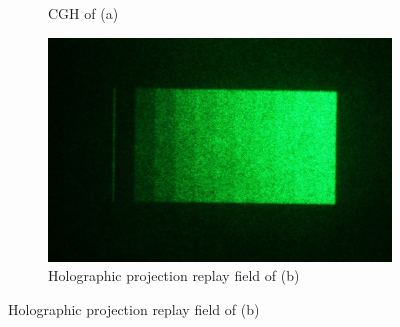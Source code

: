 \begin{figure}[H]
\begin{subfigure}[t]{0.3\textwidth}
    \caption{CGH of (a)}\label{fig:Holo_10_step_original}
  \end{subfigure}
  \hfill
  \begin{subfigure}[t]{0.37\textwidth}
    \includegraphics[width=\textwidth]{10step_before_correction.png}
    \caption{Holographic projection replay field of (b)}\label{fig:10step_before_correction}
  \end{subfigure}


\end{figure}
